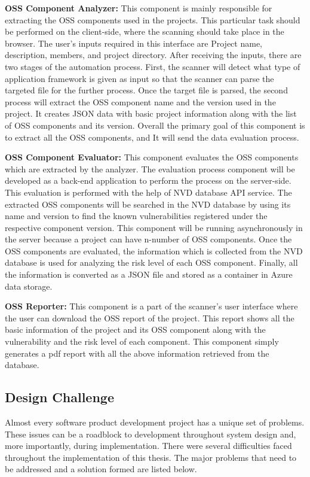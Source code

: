 \textbf{\acs{OSS} Component Analyzer:} This component is mainly responsible for extracting the \acs{OSS} components used in the projects. This particular task should be performed on the client-side, where the scanning should take place in the browser. The user's inputs required in this interface are Project name, description, members, and project directory. After receiving the inputs, there are two stages of the automation process. First, the scanner will detect what type of application framework is given as input so that the scanner can parse the targeted file for the further process. Once the target file is parsed, the second process will extract the \acs{OSS} component name and the version used in the project. It creates \acs{JSON} data with basic project information along with the list of \acs{OSS} components and its version. Overall the primary goal of this component is to extract all the \acs{OSS} components, and It will send the data evaluation process.
	
\textbf{\acs{OSS} Component Evaluator:} This component evaluates the \acs{OSS} components which are extracted by the analyzer. The evaluation process component will be developed as a back-end application to perform the process on the server-side. This evaluation is performed with the help of \acs{NVD} database \acs{API} service. The extracted \acs{OSS} components will be searched in the \acs{NVD} database by using its name and version to find the known vulnerabilities registered under the respective component version. This component will be running asynchronously in the server because a project can have n-number of \acs{OSS} components. Once the \acs{OSS} components are evaluated, the information which is collected from the \acs{NVD} database is used for analyzing the risk level of each \acs{OSS} component. Finally, all the information is converted as a \acs{JSON} file and stored as a container in Azure data storage.
	
\textbf{\acs{OSS} Reporter:} This component is a part of the scanner’s user interface where the user can download the \acs{OSS} report of the project. This report shows all the basic information of the project and its \acs{OSS} component along with the vulnerability and the risk level of each component. This component simply generates a pdf report with all the above information retrieved from the database.
	
\subsection{Design Challenge}
Almost every software product development project has a unique set of problems. These issues can be a roadblock to development throughout system design and, more importantly, during implementation. There were several difficulties faced throughout the implementation of this thesis. The major problems that need to be addressed and a solution formed are listed below.

